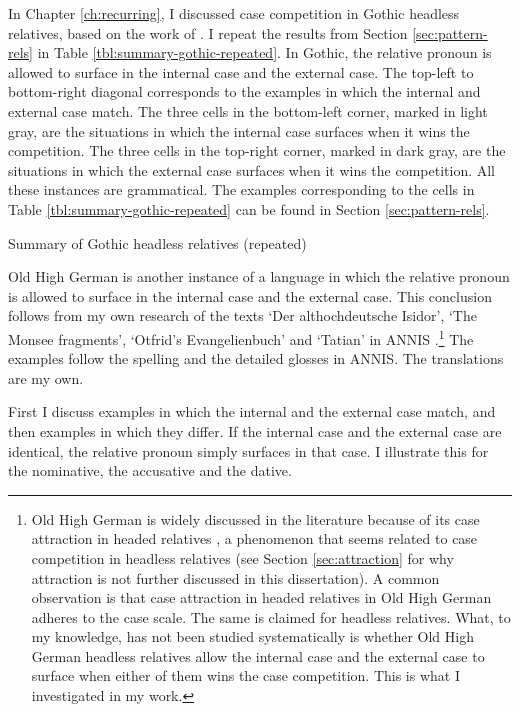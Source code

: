 In Chapter \ref{ch:recurring}, I discussed case competition in Gothic headless relatives, based on the work of \citet{harbert1978}. I repeat the results from Section \ref{sec:pattern-rels} in Table \ref{tbl:summary-gothic-repeated}.
In Gothic, the relative pronoun is allowed to surface in the internal case and the external case. The top-left to bottom-right diagonal corresponds to the examples in which the internal and external case match. The three cells in the bottom-left corner, marked in light gray, are the situations in which the internal case surfaces when it wins the competition. The three cells in the top-right corner, marked in dark gray, are the situations in which the external case surfaces when it wins the competition.
 All these instances are grammatical. The examples corresponding to the cells in Table \ref{tbl:summary-gothic-repeated} can be found in Section \ref{sec:pattern-rels}.

\begin{table}[H]
  \center
  \caption{Summary of Gothic headless relatives (repeated)}
    
    \label{tbl:summary-gothic-repeated}
\end{table}

Old High German is another instance of a language in which the relative pronoun is allowed to surface in the internal case and the external case. This conclusion follows from my own research of the texts `Der althochdeutsche Isidor', `The Monsee fragments', `Otfrid's Evangelienbuch' and `Tatian' in ANNIS \citep{krause2016}.\footnote{
Old High German is widely discussed in the literature because of its case attraction in headed relatives \citep[cf.][]{pittner1995}, a phenomenon that seems related to case competition in headless relatives (see Section \ref{sec:attraction} for why attraction is not further discussed in this dissertation).
A common observation is that case attraction in headed relatives in Old High German adheres to the case scale. The same is claimed for headless relatives.
What, to my knowledge, has not been studied systematically is whether Old High German headless relatives allow the internal case and the external case to surface when either of them wins the case competition. This is what I investigated in my work.
}
The examples follow the spelling and the detailed glosses in ANNIS. The translations are my own.

First I discuss examples in which the internal and the external case match, and then examples in which they differ. If the internal case and the external case are identical, the relative pronoun simply surfaces in that case. I illustrate this for the nominative, the accusative and the dative.

